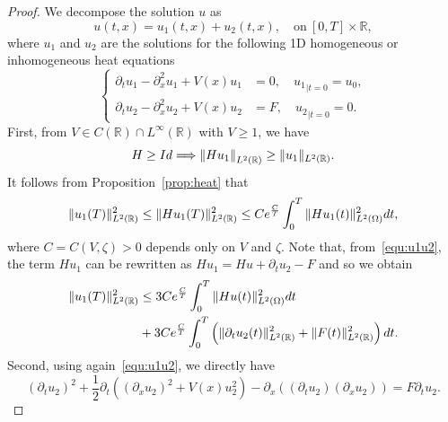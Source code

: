 \documentclass[a4paper,reqno]{amsart}
\theoremstyle{definition}
\numberwithin{equation}{section}
\newcommand{\R}{\mathbb{R}}
\def \R {{\mathbb{R} }}
\def \d {{\rm{d}}}
\def \pt{\partial_{t}}
\begin{document}
\begin{proof}
    We decompose the solution $u$ as 
    \begin{equation*}
        u(t,x)=u_{1}(t,x)+u_{2}(t,x),\quad \mbox{on}\ [0,T]\times \R,
    \end{equation*}
    where $u_{1}$ and $u_{2}$ are the solutions for the following 1D homogeneous or inhomogeneous heat equations
    \begin{equation}\label{equ:u1u2}
        \left\{
\begin{aligned}
    \partial_{t}u_{1}-\partial_{x}^{2}u_{1}+V(x)u_{1}&=0,\quad {u_{1}}_{|t=0}=u_{0},\\
    \partial_{t}u_{2}-\partial_{x}^{2}u_{2}+V(x)u_{2}&=F,\quad {u_{2}}_{|t=0}=0.\end{aligned}
        \right.
    \end{equation}
    First, from $V\in C(\R)\cap L^{\infty}(\R)$ with $V\ge 1$, we have 
    \begin{equation*}
        H\ge {\rm{Id}}\Longrightarrow \left\|Hu_{1}\right\|_{L^{2}(\R)}\ge \|u_{1}\|_{L^{2}(\R)}.
    \end{equation*}
    It follows from Proposition~\ref{prop:heat} that 
    \begin{equation*}
        \|u_{1}(T)\|_{L^{2}(\R)}^{2}\le \|Hu_{1}(T)\|_{L^{2}(\R)}^{2}\le Ce^{\frac{C}{T}}\int_{0}^{T}\|Hu_{1}(t)\|^{2}_{L^{2}(\Omega)}\d t,
        \end{equation*}
        where $C=C(V,\zeta)>0$ depends only on $V$ and $\zeta$. Note that, from~\eqref{equ:u1u2}, the term $Hu_{1}$ can be rewritten as $Hu_{1}=Hu+\partial_{t}u_{2}-F$ and so we obtain
        \begin{equation}\label{est:u1}
        \begin{aligned}
             \|u_{1}(T)\|_{L^{2}(\R)}^{2}
             &\le 3Ce^{\frac{C}{T}}\int_{0}^{T}\|Hu(t)\|^{2}_{L^{2}(\Omega)}\d t\\
            &+3Ce^{\frac{C}{T}}\int_{0}^{T}\left(\|\partial_{t}u_{2}(t)\|^{2}_{L^{2}(\R)}+\|F(t)\|^{2}_{L^{2}(\R)}      
            \right)\d t.  
            \end{aligned}
             \end{equation}
             Second, using again~\eqref{equ:u1u2}, we directly have 
             \begin{equation*}
                (\pt u_{2})^{2}+\frac{1}{2}\partial_{t}\left((\partial_{x}u_{2})^{2}+V(x)u_{2}^{2}\right)-\partial_{x}\left((\partial_{t}u_{2})(\partial_{x}u_{2})\right)=F\partial_{t}u_{2}.
             \end{equation*}

\end{proof}
\end{document}
